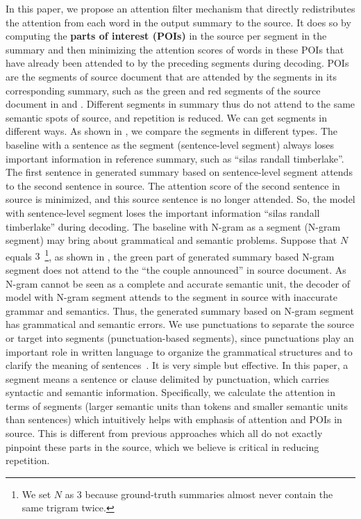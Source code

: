 In this paper, we propose an attention filter mechanism that directly 
redistributes the attention from each word in the output summary to the source. 
It does so by computing the \textbf{parts of interest (POIs)} 
in the source per segment in the summary
and then minimizing the attention scores of
words in these POIs that have already been attended to by the preceding 
segments during decoding. 
POIs are the segments of source document that are attended by the segments in its corresponding summary, 
such as the green and red segments of the source document in  and .
Different segments in summary thus do not attend to the same semantic spots
of source, and repetition is reduced. 
We can get segments in different ways.
As shown in , we compare the segments in different types.
The baseline with a sentence as the segment (sentence-level segment) 
always loses important information in reference summary, such as ``silas randall timberlake''.
The first sentence in generated summary 
based on sentence-level segment attends to 
the second sentence in source. 
The attention score of the second sentence in source is minimized,
and this source sentence is no longer attended. 
So, the model with sentence-level segment loses the important information ``silas randall timberlake''
during decoding.
The baseline with N-gram as a segment (N-gram segment) may bring about grammatical and semantic problems.
Suppose that $N$ equals $3$~\footnote{We set $N$ as $3$ because ground-truth summaries almost never contain the same trigram twice.}, 
as shown in ,
the green part of generated summary based N-gram segment does not attend to the ``the couple announced''
in source document. 
As N-gram cannot be seen as a complete and accurate semantic unit,
the decoder of model with N-gram segment attends to the segment in source with inaccurate grammar and semantics.
Thus, the generated summary based on N-gram segment has grammatical and semantic errors.
We use punctuations to separate the source or target into segments (punctuation-based segments),
since punctuations play an important role in written language to organize
the grammatical structures and to clarify the meaning of sentences~\citep{briscoe1996,Kim19,LiWE19}.
It is very simple but effective. 
In this paper, a segment means 
a sentence or clause delimited by punctuation,
which carries syntactic and semantic information. 
Specifically, we calculate the attention in terms of segments 
(larger semantic units than tokens and smaller semantic units than sentences)
which intuitively helps with emphasis of attention and POIs in source.
This is different from previous approaches
which all do not exactly pinpoint these parts in the source,
which we believe is critical in reducing repetition. 

